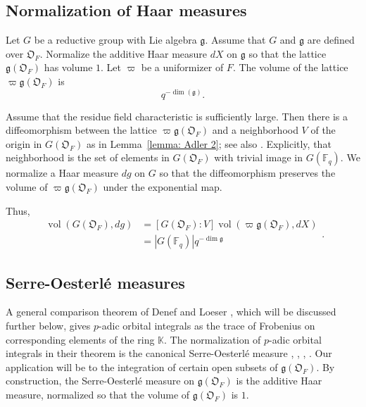 \documentclass[11pt]{amsart}
\theoremstyle{definition}
\theoremstyle{remark}
\numberwithin{equation}{theorem}
\def\F{{F}}
\def\A{{\mathfrak{O}_\F}}
\def\vol{{\operatorname{vol}}}
\def\bb#1{{\mathbb #1}}
\newcommand{\ring}[1]{\mathbb{#1}}
\def\lie#1{{\mathfrak{#1}}}
\def\vol{\operatorname{vol}}
\begin{document}
\subsection{Normalization of Haar
measures}\label{sec:norm-measure}

Let $G$ be a reductive group with Lie algebra $\lie{g}$.  Assume
that $G$ and $\lie{g}$ are defined over $\A$. Normalize the
additive Haar measure $dX$ on $\lie{g}$ so that the lattice
$\lie{g}(\A)$ has volume $1$. Let $\varpi$ be a uniformizer of
$F$. The volume of the lattice $\varpi \lie{g}(\A)$ is
    \begin{equation}q^{-\dim(\lie{g})}.\end{equation}

Assume that the residue field characteristic is sufficiently
large.  Then there is a diffeomorphism between the lattice $\varpi
\lie{g}(\A)$ and a neighborhood $V$ of the origin in $G(\A)$
\cite{WH} as in Lemma~\ref{lemma: Adler 2}; see also \cite{deB}.
Explicitly, that neighborhood is the set of elements in $G(\A)$
with trivial image in $G(\bb{F}_q)$.  We normalize a Haar measure
$dg$ on $G$ so that the diffeomorphism preserves the volume of
$\varpi \lie{g}(\A)$ under the exponential map.

Thus,
    \begin{equation}
    \begin{array}{lll}
    \vol(G(\A),dg) &= [G(\A):V] \vol(\varpi  \lie{g}(\A),dX) \\
            &=
        {{|G(\bb{F}_q)|}{q^{-\dim\lie{g}}}}
    \end{array}.\end{equation}

\subsection{Serre-Oesterl\'e measures}

A general comparison theorem of Denef and Loeser \cite{DLD}, which
will be discussed further below, gives $p$-adic orbital integrals
as the trace of Frobenius on corresponding elements of the ring
$\ring{K}$. The normalization of $p$-adic orbital integrals in
their theorem is the canonical Serre-Oesterl\'e measure
\cite[Sec.8.2]{DLD}, \cite{S}, \cite{O}, \cite{V}.  Our
application will be to the integration of certain open subsets of
$\lie{g}(\A)$. By construction, the Serre-Oesterl\'e measure on
$\lie{g}(\A)$ is the additive Haar measure, normalized so that the
volume of $\lie{g}(\A)$ is $1$.
\end{document}
